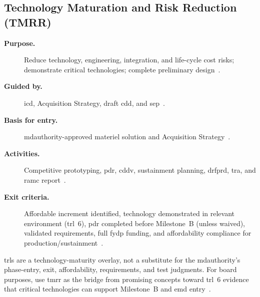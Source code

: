\documentclass[../main.tex]{subfiles}
\begin{document}
\subsection{Technology Maturation and Risk Reduction (TMRR)}
\begin{description}
  \item[\textbf{Purpose.}] Reduce technology, engineering, integration, and life-cycle cost risks; demonstrate critical technologies; complete preliminary design~\autocite{DoDI5000-85,USDRE-TRA-2025,edo-3-3-2-acq-milestones-phases-2025}.
  \item[\textbf{Guided by.}] \ac{icd}, Acquisition Strategy, draft \ac{cdd}, and \ac{sep}~\autocite{DoDI5000-85,edo-3-3-2-acq-milestones-phases-2025}.
  \item[\textbf{Basis for entry.}] \ac{mdauthority}-approved materiel solution and Acquisition Strategy~\autocite{DoDI5000-85,edo-3-3-2-acq-milestones-phases-2025}.
  \item[\textbf{Activities.}] Competitive prototyping, \ac{pdr}, \ac{cddv}, sustainment planning, \ac{drfprd}, \ac{tra}, and \ac{ramc} report~\autocite{DoDI5000-85,USDRE-TRA-2025,edo-3-3-2-acq-milestones-phases-2025}.
  \item[\textbf{Exit criteria.}] Affordable increment identified, technology demonstrated in relevant environment (\ac{trl}~6), \ac{pdr} completed before Milestone~B (unless waived), validated requirements, full \ac{fydp} funding, and affordability compliance for production/sustainment~\autocite{DoDI5000-85,USDRE-TRA-2025,edo-3-3-2-acq-milestones-phases-2025}.
\end{description}
\acp{trl} are a technology-maturity overlay, not a substitute for the \ac{mdauthority}'s phase-entry, exit, affordability, requirements, and test judgments. For board purposes, use \ac{tmrr} as the bridge from promising concepts toward \ac{trl}~6 evidence that critical technologies can support Milestone~B and \ac{emd} entry~\autocite{DoDI5000-85,USDRE-TRA-2025,edo-3-3-2-acq-milestones-phases-2025}.
\end{document}
